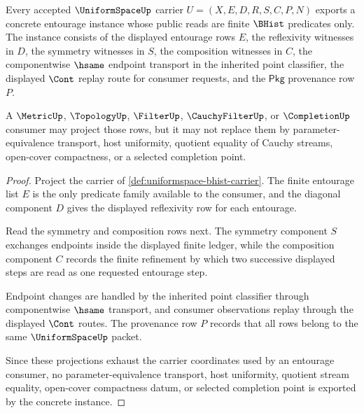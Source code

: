 \begin{theorem}
\label{thm:uniformspace-concrete-entourage-instance}
Every accepted $\UniformSpaceUp$ carrier $U=(X,E,D,R,S,C,P,N)$ exports a
concrete entourage instance whose public reads are finite $\BHist$
predicates only. The instance consists of the displayed entourage rows
$E$, the reflexivity witnesses in $D$, the symmetry witnesses in $S$, the
composition witnesses in $C$, the componentwise $\hsame$ endpoint transport
in the inherited point classifier, the displayed $\Cont$ replay route for
consumer requests, and the $\mathsf{Pkg}$ provenance row $P$.

A $\MetricUp$, $\TopologyUp$, $\FilterUp$, $\CauchyFilterUp$, or
$\CompletionUp$ consumer may project those rows, but it may not replace them
by parameter-equivalence transport, host uniformity, quotient equality of
Cauchy streams, open-cover compactness, or a selected completion point.
\end{theorem}
\begin{proof}
Project the carrier of \autoref{def:uniformspace-bhist-carrier}. The finite
entourage list $E$ is the only predicate family available to the consumer, and
the diagonal component $D$ gives the displayed reflexivity row for each
entourage.

Read the symmetry and composition rows next. The symmetry component $S$
exchanges endpoints inside the displayed finite ledger, while the composition
component $C$ records the finite refinement by which two successive displayed
steps are read as one requested entourage step.

Endpoint changes are handled by the inherited point classifier through
componentwise $\hsame$ transport, and consumer observations replay through the
displayed $\Cont$ routes. The provenance row $P$ records that all rows belong
to the same $\UniformSpaceUp$ packet.

Since these projections exhaust the carrier coordinates used by an entourage
consumer, no parameter-equivalence transport, host uniformity, quotient stream
equality, open-cover compactness datum, or selected completion point is
exported by the concrete instance.
\end{proof}

